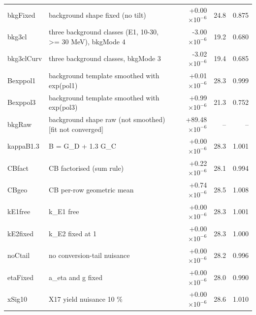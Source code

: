 \begin{tabular}{llrrr}
bkgFixed & background shape fixed (no tilt) & +0.00$\times10^{-6}$ & 24.8 & 0.875 \\
bkg3cl & three background classes (E1, 10-30, >= 30 MeV), bkgMode 4 & -3.00$\times10^{-6}$ & 19.2 & 0.680 \\
bkg3clCurv & three background classes, bkgMode 3 & -3.02$\times10^{-6}$ & 19.4 & 0.685 \\
Bexppol1 & background template smoothed with exp(pol1) & +0.01$\times10^{-6}$ & 28.3 & 0.999 \\
Bexppol3 & background template smoothed with exp(pol3) & +0.99$\times10^{-6}$ & 21.3 & 0.752 \\
bkgRaw & background shape raw (not smoothed) [fit not converged] & +89.48$\times10^{-6}$ & -- & -- \\
kappaB1.3 & B = G\_D + 1.3 G\_C & +0.00$\times10^{-6}$ & 28.3 & 1.001 \\
CBfact & CB factorised (sum rule) & +0.22$\times10^{-6}$ & 28.1 & 0.994 \\
CBgeo & CB per-row geometric mean & +0.74$\times10^{-6}$ & 28.5 & 1.008 \\
kE1free & k\_E1 free & +0.00$\times10^{-6}$ & 28.3 & 1.001 \\
kE2fixed & k\_E2 fixed at 1 & +0.00$\times10^{-6}$ & 28.3 & 1.000 \\
noCtail & no conversion-tail nuisance & +0.00$\times10^{-6}$ & 28.2 & 0.996 \\
etaFixed & a\_eta and g fixed & +0.00$\times10^{-6}$ & 28.0 & 0.990 \\
xSig10 & X17 yield nuisance 10 \% & +0.00$\times10^{-6}$ & 28.6 & 1.010 \\
\bottomrule
\end{tabular}
